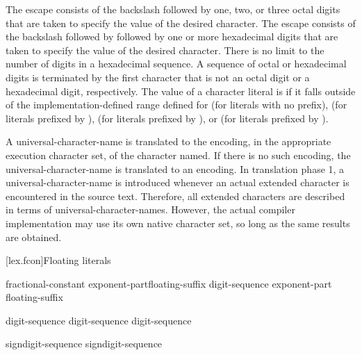 \pnum
The escape
%
 consists of the backslash followed by one,
two, or three octal digits that are taken to specify the value of the
desired character. The escape
%
consists of the backslash followed by  followed by one or more
hexadecimal digits that are taken to specify the value of the desired
character. There is no limit to the number of digits in a hexadecimal
sequence. A sequence of octal or hexadecimal digits is terminated by the
first character that is not an octal digit or a hexadecimal digit,
respectively.
%
The value of a character literal is  if it falls outside of the implementation-defined range defined for
(for literals with no prefix),  (for literals prefixed
by ),  (for literals prefixed by
), or  (for literals prefixed by ).

\pnum
A universal-character-name is translated to the encoding, in the appropriate
execution character set, of the character named. If there is no such
encoding, the universal-character-name is translated to an
 encoding.
\enternote In translation phase 1, a universal-character-name is introduced whenever an
actual extended
character is encountered in the source text. Therefore, all extended
characters are described in terms of universal-character-names. However,
the actual compiler implementation may use its own native character set,
so long as the same results are obtained. \exitnote

[lex.fcon]{Floating literals}

%
\begin{bnf}
\br
    fractional-constant exponent-part\opt floating-suffix\opt\br
    digit-sequence exponent-part floating-suffix\opt
\end{bnf}

\begin{bnf}
\br
    digit-sequence\opt{}  digit-sequence\br
    digit-sequence 
\end{bnf}

\begin{bnf}
\br
     sign\opt digit-sequence\br
     sign\opt digit-sequence
\end{bnf}

